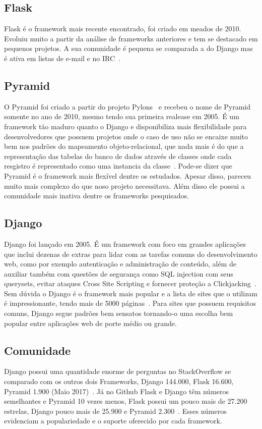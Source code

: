 \documentclass[a4paper, 12pt, oneside]{book}
\begin{document}
\subsection{Flask}
Flask é o framework mais recente encontrado, foi criado em meados de 2010. Evoluiu muito a partir da análise de frameworks anteriores e tem se destacado em pequenos projetos. A sua comunidade é pequena se comparada a do Django mas é ativa em listas de e-mail e no IRC~\cite{ryanbrown}. 

\subsection{Pyramid}
O Pyramid foi criado a partir do projeto Pylons~\cite{pylonsproject} e recebeu o nome de Pyramid somente no ano de 2010, mesmo tendo sua primeira realease em 2005. É um framework tão maduro quanto o Django e disponibiliza mais flexibilidade para desenvolvedores que possuem projetos onde o caso de uso não se encaixe muito bem nos padrões do mapeamento objeto-relacional, que nada mais é do que a representação das tabelas do banco de dados através de classes onde cada resgistro é representado como uma instancia da classe~\cite{pyramid}. Pode-se dizer que Pyramid é o framework mais flexível dentre os estudados. Apesar disso, pareceu muito mais complexo do que noso projeto necessitava. Além disso ele possui a comunidade mais inativa dentre os frameworks pesquisados.

\subsection{Django}
Django foi lançado em 2005. É um framework com foco em grandes aplicações que inclui dezenas de extras para lidar com as tarefas comuns do desenvolvimento web, como por exemplo autenticação e administração de conteúdo, além de auxiliar também com questões de segurança como SQL injection com seus querysets, evitar ataques Cross Site Scripting e fornecer proteção a Clickjacking~\cite{django}. Sem dúvida o Django é o framework mais popular e a lista de sites que o utilizam é impressionante, tendo mais de 5000 páginas~\cite{listadjangosites}. Para sites que possuem requisitos comuns, Django segue padrões bem sensatos tornando-o uma escolha bem popular entre aplicações web de porte médio ou grande.

\subsection{Comunidade}
Django possui uma quantidade enorme de perguntas no StackOverflow se comparado com os outros dois Frameworks, Django 144.000, Flask 16.600, Pyramid 1.900 (Maio 2017)~\cite{stackoverflowtags}. Já no Github Flask e Django têm números semelhantes e Pyramid 10 vezes menos, Flask possui um pouco mais de 27.200 estrelas, Django pouco mais de 25.900 e Pyramid 2.300~\cite{github}. Esses números evidenciam a populariedade e o suporte oferecido por cada framework.
\end{document}
